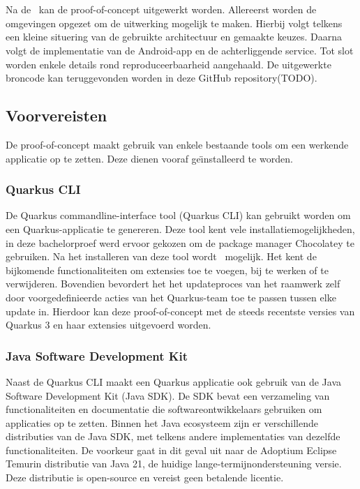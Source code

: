
\chapter{}
\label{ch:proof-of-concept}
Na de~ kan de proof-of-concept uitgewerkt worden.
Allereerst worden de omgevingen opgezet om de uitwerking mogelijk te maken.
Hierbij volgt telkens een kleine situering van de gebruikte architectuur en gemaakte keuzes.
Daarna volgt de implementatie van de Android-app en de achterliggende service.
Tot slot worden enkele details rond reproduceerbaarheid aangehaald.
De uitgewerkte broncode kan teruggevonden worden in deze GitHub repository(TODO). %

\section{Voorvereisten}
\label{sec:voorvereisten}
De proof-of-concept maakt gebruik van enkele bestaande tools om een werkende applicatie op te zetten.
Deze dienen vooraf ge\"{\i}nstalleerd te worden.

\subsection{Quarkus CLI}
\label{subsec:de-quarkus-cli}
De Quarkus commandline-interface tool (Quarkus CLI) kan gebruikt worden om een Quarkus-applicatie te genereren.
Deze tool kent vele installatiemogelijkheden, in deze bachelorproef werd ervoor gekozen om de package manager Chocolatey te gebruiken.
Na het installeren van deze tool wordt~ mogelijk.
Het kent de bijkomende functionaliteiten om extensies toe te voegen, bij te werken of te verwijderen.
Bovendien bevordert het het updateproces van het raamwerk zelf door voorgedefinieerde acties van het Quarkus-team toe te passen tussen elke update in.
Hierdoor kan deze proof-of-concept met de steeds recentste versies van Quarkus 3 en haar extensies uitgevoerd worden.

\subsection{Java Software Development Kit}
\label{subsec:java-software-development-kit}
Naast de Quarkus CLI maakt een Quarkus applicatie ook gebruik van de Java Software Development Kit (Java SDK).
De SDK bevat een verzameling van functionaliteiten en documentatie die softwareontwikkelaars gebruiken om applicaties op te zetten.
Binnen het Java ecosysteem zijn er verschillende distributies van de Java SDK, met telkens andere implementaties van dezelfde functionaliteiten.
De voorkeur gaat in dit geval uit naar de Adoptium Eclipse Temurin distributie van Java 21, de huidige lange-termijnondersteuning versie.
Deze distributie is open-source en vereist geen betalende licentie.

